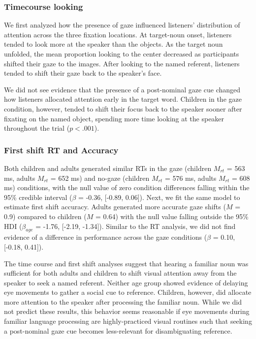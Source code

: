 \documentclass[10pt, letterpaper]{article}
\begin{document}
\hypertarget{timecourse-looking}{%
\subsubsection{Timecourse looking}\label{timecourse-looking}}

We first analyzed how the presence of gaze influenced listeners'
distribution of attention across the three fixation locations. At
target-noun onset, listeners tended to look more at the speaker than the
objects. As the target noun unfolded, the mean proportion looking to the
center decreased as participants shifted their gaze to the images. After
looking to the named referent, listeners tended to shift their gaze back
to the speaker's face.

We did not see evidence that the presence of a post-nominal gaze cue
changed how listeners allocated attention early in the target word.
Children in the gaze condition, however, tended to shift their focus
back to the speaker sooner after fixating on the named object, spending
more time looking at the speaker throughout the trial (\(p < .001\)).

\hypertarget{first-shift-rt-and-accuracy}{%
\subsubsection{First shift RT and
Accuracy}\label{first-shift-rt-and-accuracy}}

Both children and adults generated similar RTs in the gaze (children
\(M_{rt}\) = 563 ms, adults \(M_{rt}\) = 652 ms) and no-gaze (children
\(M_{rt}\) = 576 ms, adults \(M_{rt}\) = 608 ms) conditions, with the
null value of zero condition differences falling within the 95\%
credible interval (\(\beta\) = -0.36, {[}-0.89, 0.06{]}). Next, we fit
the same model to estimate first shift accuracy. Adults generated more
accurate gaze shifts (\(M\) = 0.9) compared to children (\(M\) = 0.64)
with the null value falling outside the 95\% HDI (\(\beta_{age}\) =
-1.76, {[}-2.19, -1.34{]}). Similar to the RT analysis, we did not find
evidence of a difference in performance across the gaze conditions
(\(\beta\) = 0.10, {[}-0.18, 0.41{]}).

The time course and first shift analyses suggest that hearing a familiar
noun was sufficient for both adults and children to shift visual
attention away from the speaker to seek a named referent. Neither age
group showed evidence of delaying eye movements to gather a social cue
to reference. Children, however, did allocate more attention to the
speaker after processing the familiar noun. While we did not predict
these results, this behavior seems reasonable if eye movements during
familiar language processing are highly-practiced visual routines such
that seeking a post-nominal gaze cue becomes less-relevant for
disambiguating reference.
\end{document}
